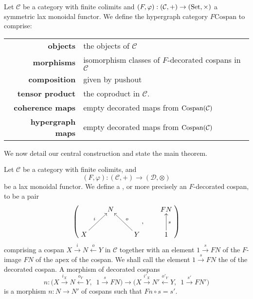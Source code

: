 \begin{definition} \label{thm:fcospanss}
  Let $\mathcal C$ be a category with finite colimits and $(F,\varphi):
  (\mathcal C,+) \to (\mathrm{Set}, \times)$ a symmetric lax monoidal functor. We define
  the hypergraph category $F\mathrm{Cospan}$ to comprise:

  \begin{tabular}{ r p{}}
    \textbf{objects} & the objects of $\mathcal C$ \\ 
    \textbf{morphisms} & isomorphism classes of $F$-decorated cospans in
    $\mathcal C$\\ 
  \textbf{composition} & given by pushout \\
  \textbf{tensor product} & the coproduct in $\mathcal C$. \\
  \textbf{coherence maps} & empty decorated maps from $\operatorname{{Cospan}}(\mathcal C)$ \\
  \textbf{hypergraph maps} & empty decorated maps from $\operatorname{{Cospan}}(\mathcal C)$
  \end{tabular}
\end{definition}


We now detail our central construction and state the main theorem.
\begin{definition} \label{def:fcospans}
  Let $\mathcal C$ be a category with finite colimits, and
  \[
    (F,\varphi)\colon  (\mathcal C,+) \longrightarrow (\mathcal D, \otimes)
  \]
  be a lax monoidal functor. We define a , or more
  precisely an $F$-decorated cospan, to be a pair 
  \[
    \left(
    \begin{aligned}
      \xymatrix{
	& N \\  
	X \ar[ur]^{i} && Y \ar[ul]_{o}
      }
    \end{aligned}
    ,
    \qquad
    \begin{aligned}
      \xymatrix{
	FN \\
	1 \ar[u]_{s}
      }
    \end{aligned}
    \right)
  \]
  comprising a cospan $X \stackrel{i}\rightarrow N \stackrel{o}\leftarrow Y$ in
  $\mathcal C$ together with an element $1 \stackrel{s}\rightarrow FN$ of
  the $F$-image $FN$ of the apex of the cospan. We shall call the element $1
  \stackrel{s}\rightarrow FN$ the  of the decorated
  cospan. A morphism of decorated cospans 
  \[
    n\colon  \big(X \stackrel{i_X}\longrightarrow N \stackrel{o_Y}\longleftarrow
    Y,\enspace 1 \stackrel{s}\longrightarrow FN\big) \longrightarrow \big(X
    \stackrel{i'_X}\longrightarrow N' \stackrel{o'_Y}\longleftarrow Y,\enspace 1
    \stackrel{s'}\longrightarrow FN'\big)
  \]
  is a morphism $n\colon  N \to N'$ of cospans such that $Fn \circ s = s'$.
\end{definition}

